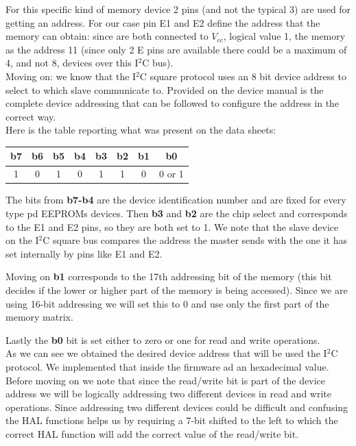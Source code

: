 \documentclass[../main.tex]{subfiles}
\begin{document}
For this specific kind of memory device 2 pins (and not the typical 3) are used for getting an address. For our case pin E1 and E2 define the address that the memory can obtain: since are both connected to $V_{cc}$, logical value 1, the memory as the address 11 (since only 2 E pins are available there could be a maximum of 4, and not 8, devices over this I$^2$C bus).\\

Moving on: we know that the I$^2$C square protocol uses an 8 bit device address to select to which slave communicate to.
Provided on the device manual is the complete device addressing that can be followed to configure the address in the correct way.\\


Here is the table reporting what was present on the data sheets:

\begin{center}
\begin{tabular}{c c c c c c c c}
\textbf{b7} & \textbf{b6} & \textbf{b5} & \textbf{b4} & \textbf{b3} & \textbf{b2} & \textbf{b1} & \textbf{b0} \\
\hline

1 & 0 & 1 & 0 & 1 & 1 & 0 &  0 or 1 \\

\end{tabular}
\end{center}

The bits from \textbf{b7-b4} are the device identification number and are fixed for every type pd EEPROMs devices.
Then \textbf{b3} and \textbf{b2} are the chip select and corresponds to the E1 and E2 pins, so they are both set to 1. We note that the slave device on the I$^2$C square bus compares the address the master sends with the one it has set internally by pins like E1 and E2.

Moving on \textbf{b1} corresponds to the 17th addressing bit of the memory (this bit decides if the lower or higher part of the memory is being accessed). Since we are using 16-bit addressing we will set this to 0 and use only the first part of the memory matrix.

Lastly the \textbf{b0} bit is set either to zero or one for read and write operations.\\

As we can see we obtained the desired device address that will be used the I$^2$C protocol. We implemented that inside the firmware ad an hexadecimal value. Before moving on we note that since the read/write bit is part of the device address we will be logically addressing two different devices in read and write operations. Since addressing two different devices could be difficult and confusing the HAL functions helps us by requiring a 7-bit shifted to the left to which the correct HAL function will add the correct value of the read/write bit.\\
\end{document}
